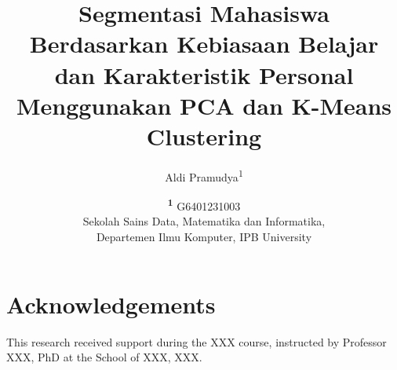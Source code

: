 \documentclass[onecolumn]{NobArticle}
\title{Segmentasi Mahasiswa Berdasarkan Kebiasaan Belajar dan Karakteristik Personal Menggunakan PCA dan K-Means Clustering}
\author{
    Aldi Pramudya\textsuperscript{1}
}
\date{
    \textsuperscript{\textbf{1}} G6401231003 \\  %
    Sekolah Sains Data, Matematika dan Informatika, \\
    Departemen Ilmu Komputer, IPB University \\
}
\begin{document}
\small
\maketitle








\section*{Acknowledgements}
This research received support during the XXX course, instructed by Professor XXX, PhD at the School of XXX, XXX.

\printbibliography
\end{document}

